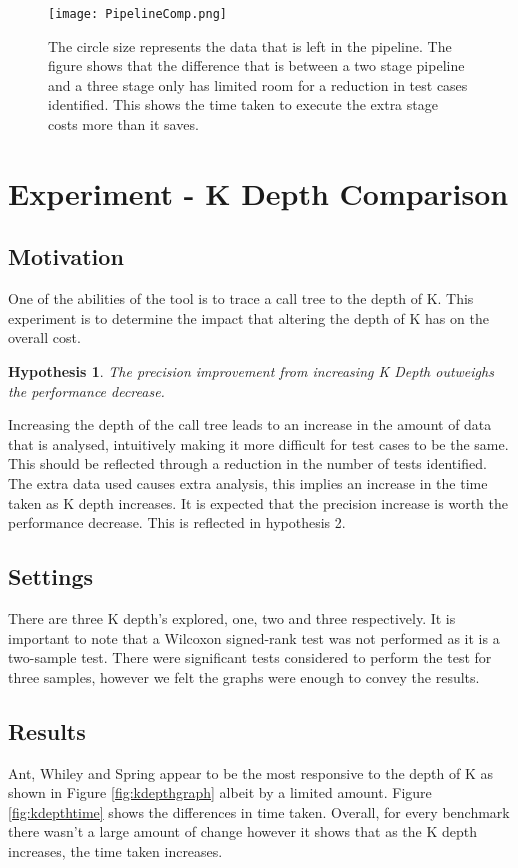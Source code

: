 \documentclass[11pt
              , a4paper
              , twoside
              , openright
              ]{report}
\newcommand{\rom}[1]{\uppercase\expandafter{\romannumeral #1\relax}}
\newtheorem{hyp}{Hypothesis}
\begin{document}
\begin{figure}[h]
\centering
\texttt{[image: PipelineComp.png]}
\caption{The circle size represents the data that is left in the pipeline. The figure shows that the difference that is between a two stage pipeline and a three stage only has limited room for a reduction in test cases identified. This shows the time taken to execute the extra stage costs more than it saves.}
\label{fig:pipelinecomp}
\end{figure}

\section{Experiment \rom{2} - K Depth Comparison}
\label{kdepthcomp}
\subsection{Motivation}
One of the abilities of the tool is to trace a call tree to the depth of K. This experiment is to determine the impact that altering the depth of K has on the overall cost. 

\begin{hyp}
The precision improvement from increasing K Depth outweighs the performance decrease.
\end{hyp}

Increasing the depth of the call tree leads to an increase in the amount of data that is analysed, intuitively making it more difficult for test cases to be the same. This should be reflected through a reduction in the number of tests identified. The extra data used causes extra analysis, this implies an increase in the time taken as K depth increases. It is expected that the precision increase is worth the performance decrease. This is reflected in hypothesis 2.

\subsection{Settings}
There are three K depth's explored, one, two and three respectively. It is important to note that a Wilcoxon signed-rank test was not performed as it is a two-sample test. There were significant tests considered to perform the test for three samples, however we felt the graphs were enough to convey the results.


\subsection{Results}
Ant, Whiley and Spring appear to be the most responsive to the depth of K as shown in Figure \ref{fig:kdepthgraph} albeit by a limited amount. Figure \ref{fig:kdepthtime} shows the differences in time taken. Overall, for every benchmark there wasn't a large amount of change however it shows that as the K depth increases, the time taken increases.
\end{document}
